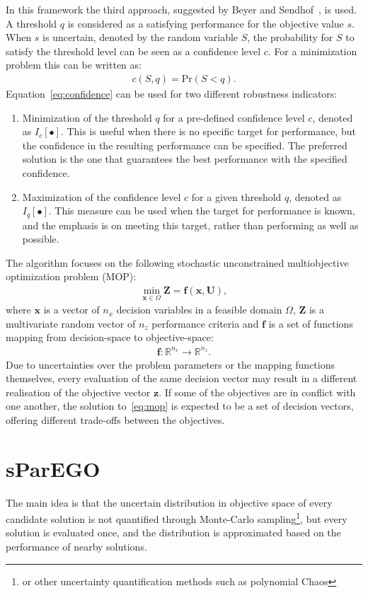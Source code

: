 \documentclass[10pt]{llncs}
\newcommand{\brr}[1]{{\left({#1}\right)}} %
\newcommand{\Iq}[1]{I_q\!\left[{#1}\right]} %
\newcommand{\Ic}[1]{I_c\!\left[{#1}\right]} %
\newcommand{\vx}{\mathbf{x}} %
\newcommand{\vf}{\mathbf{f}} %
\newcommand{\vz}{\mathbf{z}} %
\newcommand{\vZ}{\mathbf{Z}} %
\newcommand{\vU}{\mathbf{U}} %
\begin{document}
In this framework the third approach, suggested by Beyer and Sendhof~\cite{Beyer2007}, is used.
A threshold $q$ is considered as a satisfying performance for the objective value $s$.
When $s$ is uncertain, denoted by the random variable $S$, the probability for $S$ to satisfy the threshold level can be seen as a confidence level $c$.
For a minimization problem this can be written as:
\begin{align}
\label{eq:confidence}
	c\brr{S,q}=\text{Pr}\brr{S<q}.
\end{align}
Equation~\eqref{eq:confidence} can be used for two different robustness indicators:
\begin{enumerate}
	\item Minimization of the threshold $q$ for a pre-defined confidence level $c$, denoted as $\Ic{\bullet}$.
		This is useful when there is no specific target for performance, but the confidence in the resulting performance can be specified.
		The preferred solution is the one that guarantees the best performance with the specified confidence.
	\item Maximization of the confidence level $c$ for a given threshold $q$, denoted as $\Iq{\bullet}$.
		This measure can be used when the target for performance is known, and the emphasis is on meeting this target, rather than performing as well as possible.
\end{enumerate}


The algorithm focuses on the following stochastic unconstrained multiobjective optimization problem (MOP):
\begin{align}
\label{eq:mop}
	\min_{\vx\in\Omega} \vZ=\vf\brr{\vx, \vU},
\end{align}
where $\vx$ is a vector of $n_x$ decision variables in a feasible domain $\Omega$, $\vZ$ is a multivariate random vector of $n_z$ performance criteria and $\vf$ is a set of functions mapping from decision-space to objective-space:
\begin{align}
	\vf: \mathbb{R}^{n_x} \rightarrow \mathbb{R}^{n_z}.
\end{align}
Due to uncertainties over the problem parameters or the mapping functions themselves, every evaluation of the same decision vector may result in a different realisation of the objective vector $\vz$.
If some of the objectives are in conflict with one another, the solution to~\eqref{eq:mop} is expected to be a set of decision vectors, offering different trade-offs between the objectives.

\section{sParEGO}
The main idea is that the uncertain distribution in objective space of every candidate solution is not quantified through Monte-Carlo sampling\footnote{or other uncertainty quantification methods such as polynomial Chaos}, but every solution is evaluated once, and the distribution is approximated based on the performance of nearby solutions.
\end{document}

